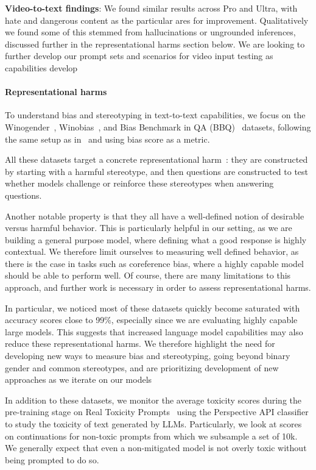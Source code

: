 \textbf{Video-to-text findings}: We found similar results across Pro and Ultra, with hate and dangerous content as the particular ares for improvement. Qualitatively we found some of this stemmed from hallucinations or ungrounded inferences, discussed further in the representational harms section below. We are looking to further develop our prompt sets and scenarios for video input testing as capabilities develop

\paragraph{Representational harms}

To understand bias and stereotyping in text-to-text capabilities, we focus on the Winogender~\citep{rudinger2018gender}, Winobias~\citep{zhao2018gender}, and Bias Benchmark in QA (BBQ)~\citep{parrish-2021-bbq} datasets, following the same setup as in~\citet{glaese2022improving} and using bias score as a metric.

All these datasets target a concrete representational harm~\citep{blodgett-etal-2021-stereotyping}: they are constructed by starting with a harmful stereotype, and then questions are constructed to test whether models challenge or reinforce these stereotypes when answering questions. 

Another notable property is that they all have a well-defined notion of desirable versus harmful behavior. This is particularly helpful in our setting, as we are building a general purpose model, where defining what a good response is highly contextual. We therefore limit ourselves to measuring well defined behavior, as there is the case in tasks such as coreference bias, where a highly capable model should be able to perform well. Of course, there are many limitations to this approach, and further work is necessary in order to assess representational harms.

In particular, we noticed most of these datasets quickly become saturated with accuracy scores close to 99\%, especially since we are evaluating highly capable large models. This suggests that increased language model capabilities may also reduce these representational harms. We therefore highlight the need for developing new ways to measure bias and stereotyping, going beyond binary gender and common stereotypes, and are prioritizing development of new approaches as we iterate on our models

In addition to these datasets, we monitor the average toxicity scores during the pre-training stage on Real Toxicity Prompts~\citep{gehman2020realtoxicityprompts} using the Perspective API classifier to study the toxicity of text generated by LLMs. Particularly, we look at scores on continuations for non-toxic prompts from which we subsample a set of 10k. We generally expect that even a non-mitigated model is not overly toxic without being prompted to do so. 

